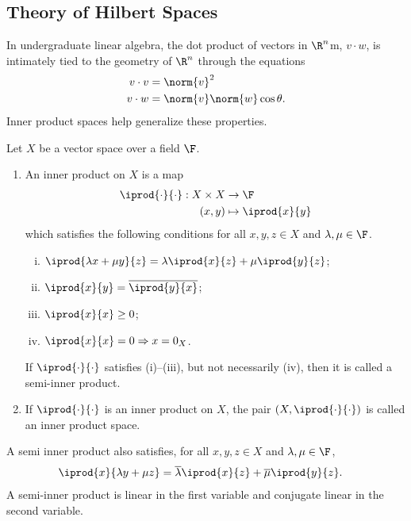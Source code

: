 \documentclass[10pt]{mypackage}
\begin{document}
\subsection{Theory of Hilbert Spaces}%
In undergraduate linear algebra, the dot product of vectors in $\R^n$m, $v\cdot w$, is intimately tied to the geometry of $\R^n$ through the equations
\begin{align*}
  v\cdot v &= \norm{v}^2\\
  v\cdot w &= \norm{v}\norm{w}\cos\theta.
\end{align*}
Inner product spaces help generalize these properties.
\begin{definition}
  Let $X$ be a vector space over a field $\F$.
  \begin{enumerate}[(1)]
    \item An inner product on $X$ is a map 
      \begin{align*}
        \iprod{\cdot}{\cdot}: X\times X &\rightarrow \F\\
        \left(x,y\right) &\mapsto \iprod{x}{y}
      \end{align*}
      which satisfies the following conditions for all $x,y,z\in X$ and $\lambda,\mu\in \F$.
    \begin{enumerate}[(i)]
      \item $ \iprod{\lambda x + \mu y}{z} = \lambda \iprod{x}{z} + \mu \iprod{y}{z} $;
      \item $ \iprod{x}{y} = \overline{ \iprod{y}{x} } $;
      \item $ \iprod{x}{x} \geq 0 $;
      \item $ \iprod{x}{x} = 0 \Rightarrow x = 0_{X} $.
    \end{enumerate}
    If $ \iprod{\cdot}{\cdot} $ satisfies (i)--(iii), but not necessarily (iv), then it is called a semi-inner product.
  \item If $ \iprod{\cdot}{\cdot} $ is an inner product on $X$, the pair $\left(X, \iprod{\cdot}{\cdot}\right)$ is called an inner product space.
  \end{enumerate}
\end{definition}
\begin{remark}
  A semi inner product also satisfies, for all $x,y,z\in X$ and $\lambda,\mu \in \F$,
  \begin{align*}
    \iprod{x}{\lambda y + \mu z} &= \overline{\lambda} \iprod{x}{z} + \overline{\mu} \iprod{y}{z}.
  \end{align*}
  A semi-inner product is linear in the first variable and conjugate linear in the second variable.
\end{remark}
\end{document}
